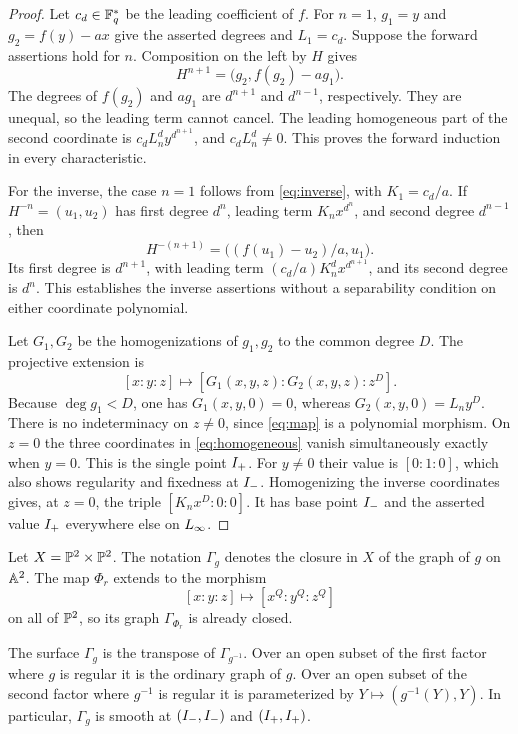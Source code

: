 \begin{proof}
Let $c_d\in\mathbb F_q^*$ be the leading coefficient of $f$. For $n=1$,
$g_1=y$ and $g_2=f(y)-ax$ give the asserted degrees and $L_1=c_d$.
Suppose the forward assertions hold for $n$. Composition on the left by
$H$ gives
\[
 H^{n+1}=\bigl(g_2,f(g_2)-ag_1\bigr).
\]
The degrees of $f(g_2)$ and $ag_1$ are $d^{n+1}$ and $d^{n-1}$,
respectively. They are unequal, so the leading term cannot cancel.
The leading homogeneous part of the second coordinate is
$c_dL_n^d y^{d^{n+1}}$, and $c_dL_n^d\ne0$. This proves the forward
induction in every characteristic.

For the inverse, the case $n=1$ follows from \eqref{eq:inverse}, with
$K_1=c_d/a$. If $H^{-n}=(u_1,u_2)$ has first degree $d^n$, leading
term $K_nx^{d^n}$, and second degree $d^{n-1}$, then
\[
 H^{-(n+1)}=\bigl((f(u_1)-u_2)/a,u_1\bigr).
\]
Its first degree is $d^{n+1}$, with leading term
$(c_d/a)K_n^d x^{d^{n+1}}$, and its second degree is $d^n$.
This establishes the inverse assertions without a separability condition
on either coordinate polynomial.

Let $G_1,G_2$ be the homogenizations of $g_1,g_2$ to the common degree $D$.
The projective extension is
\begin{equation}\label{eq:homogeneous}
 [x:y:z]\longmapsto[G_1(x,y,z):G_2(x,y,z):z^D].
\end{equation}
Because $\deg g_1<D$, one has $G_1(x,y,0)=0$, whereas
$G_2(x,y,0)=L_ny^D$. There is no indeterminacy on $z\ne0$, since
\eqref{eq:map} is a polynomial morphism. On $z=0$ the three coordinates
in \eqref{eq:homogeneous} vanish simultaneously exactly when $y=0$.
This is the single point $I_{+}$. For $y\ne0$ their value is $[0:1:0]$,
which also shows regularity and fixedness at $I_{-}$. Homogenizing the
inverse coordinates gives, at $z=0$, the triple $[K_nx^D:0:0]$.
It has base point $I_{-}$ and the asserted value $I_{+}$ everywhere else
on $L_{\infty}$.
\end{proof}

Let $X=\mathbb P^2\times\mathbb P^2$. The notation $\Gamma_g$ denotes the closure
in $X$ of the graph of $g$ on $\mathbb A^2$. The map $\Phi_r$ extends to the
morphism
\[
 [x:y:z]\longmapsto[x^Q:y^Q:z^Q]
\]
on all of $\mathbb P^2$, so its graph $\Gamma_{\Phi_r}$ is already closed.

\begin{lemma}\label{lem:graphcharts}
The surface $\Gamma_g$ is the transpose of $\Gamma_{g^{-1}}$.
Over an open subset of the first factor where $g$ is regular it is the
ordinary graph of $g$. Over an open subset of the second factor where
$g^{-1}$ is regular it is parameterized by
$Y\mapsto(g^{-1}(Y),Y)$. In particular, $\Gamma_g$ is smooth at
$(I_{-},I_{-})$ and $(I_{+},I_{+})$.
\end{lemma}

